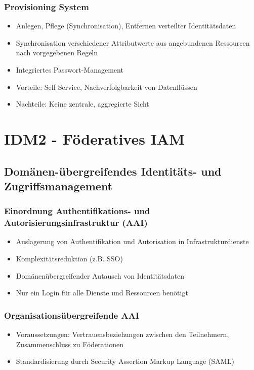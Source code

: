 \subsubsection{Provisioning System}
\begin{itemize}
	\item Anlegen, Pflege (Synchronisation), Entfernen verteilter Identitätsdaten
	\item Synchronisation verschiedener Attributwerte aus angebundenen Ressourcen nach vorgegebenen Regeln
	\item Integriertes Passwort-Management
	\item Vorteile: Self Service, Nachverfolgbarkeit von Datenflüssen
	\item Nachteile: Keine zentrale, aggregierte Sicht
\end{itemize}



\section{IDM2 - Föderatives IAM}

\subsection{Domänen-übergreifendes Identitäts- und Zugriffsmanagement}

\subsubsection{Einordnung Authentifikations- und Autorisierungsinfrastruktur (AAI)}
\begin{itemize}
	\item Auslagerung von Authentifikation und Autorisation in Infrastrukturdienste
	\item Komplexitätsreduktion (z.B. SSO)
	\item Domänenübergreifender Autausch von Identitätsdaten
	\item Nur ein Login für alle Dienste und Ressourcen benötigt
\end{itemize}

\subsubsection{Organisationsübergreifende AAI}
\begin{itemize}
	\item Voraussetzungen: Vertrauensbeziehungen zwischen den Teilnehmern, Zusammenschluss zu Föderationen
	\item Standardisierung durch Security Assertion Markup Language (SAML)
\end{itemize}


